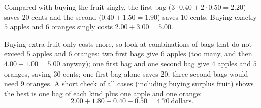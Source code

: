 Compared with buying the fruit singly, the first bag ($3\cdot0.40+2\cdot0.50=2.20$) saves $20$ cents and the second ($0.40+1.50=1.90$) saves $10$ cents. Buying exactly $5$ apples and $6$ oranges singly costs $2.00+3.00=5.00$.

Buying extra fruit only costs more, so look at combinations of bags that do not exceed $5$ apples and $6$ oranges: two first bags give $6$ apples (too many, and then $4.00+1.00=5.00$ anyway); one first bag and one second bag give $4$ apples and $5$ oranges, saving $30$ cents; one first bag alone saves $20$; three second bags would need $9$ oranges. A short check of all cases (including buying surplus fruit) shows the best is one bag of each kind plus one apple and one orange:
\[2.00+1.80+0.40+0.50=\boxed{4.70}\ \text{dollars}.\]
